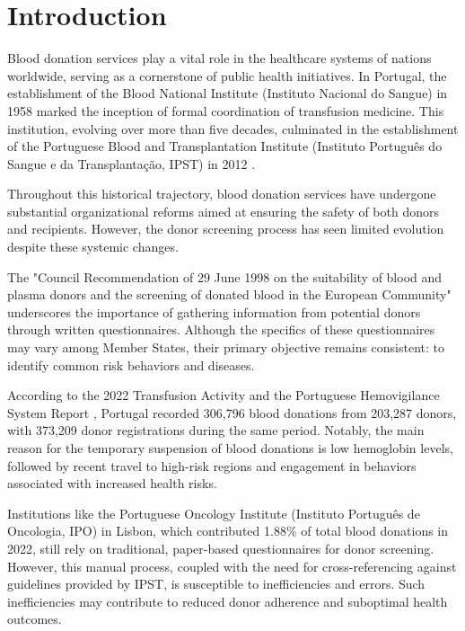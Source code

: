 %
%
\chapter{Introduction} \label{cap:intro}
Blood donation services play a vital role in the healthcare systems of nations worldwide, serving as a cornerstone of public health initiatives. In Portugal, the establishment of the Blood National Institute (Instituto Nacional do Sangue) in 1958 marked the inception of formal coordination of transfusion medicine. This institution, evolving over more than five decades, culminated in the establishment of the Portuguese Blood and Transplantation Institute (Instituto Português do Sangue e da Transplantação, IPST) in 2012 \cite{IPST_Historia}.

Throughout this historical trajectory, blood donation services have undergone substantial organizational reforms aimed at ensuring the safety of both donors and recipients. However, the donor screening process has seen limited evolution despite these systemic changes.

The "Council Recommendation of 29 June 1998 on the suitability of blood and plasma donors and the screening of donated blood in the European Community" \cite{eu-29-June-1998} underscores the importance of gathering information from potential donors through written questionnaires. Although the specifics of these questionnaires may vary among Member States, their primary objective remains consistent: to identify common risk behaviors and diseases.

According to the 2022 Transfusion Activity and the Portuguese Hemovigilance System Report \cite{IPST:2023:Report}, Portugal recorded 306,796 blood donations from 203,287 donors, with 373,209 donor registrations during the same period. Notably, the main reason for the temporary suspension of blood donations is low hemoglobin levels, followed by recent travel to high-risk regions and engagement in behaviors associated with increased health risks.

Institutions like the Portuguese Oncology Institute (Instituto Português de Oncologia, IPO) in Lisbon, which contributed 1.88\% of total blood donations in 2022, still rely on traditional, paper-based questionnaires for donor screening. However, this manual process, coupled with the need for cross-referencing against guidelines provided by IPST, is susceptible to inefficiencies and errors. Such inefficiencies may contribute to reduced donor adherence and suboptimal health outcomes.

